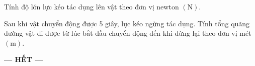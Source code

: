 \begin{ex}
Tính độ lớn lực kéo tác dụng lên vật theo đơn vị newton $\left(\si{\newton}\right)$.	
	\loigiai{
			}
\end{ex}
\begin{ex}
Sau khi vật chuyển động được 5 giây, lực kéo ngừng tác dụng. Tính tổng quãng đường vật đi được từ lúc bắt đầu chuyển động đến khi dừng lại theo đơn vị mét $\left(\si{\meter}\right)$.	
	\loigiai{
		
	}
\end{ex}
\begin{center}
	\textbf{--- HẾT ---}
\end{center}